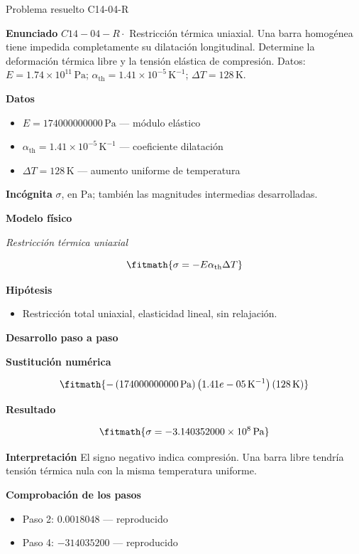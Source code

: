 \documentclass[10pt,openany]{book}
\begin{document}
\begin{studiumworked}{Problema resuelto C14-04-R}


\noindent\textbf{Enunciado}
\(C14-04-R \cdot\) Restricción térmica uniaxial. Una barra homogénea tiene impedida completamente su dilatación longitudinal. Determine la deformación térmica libre y la tensión elástica de compresión. Datos: \(E=1.74\times 10^{11}\, \mathrm{Pa}\); \(\alpha_{\mathrm{th}}=1.41\times 10^{-5}\, \mathrm{K}^{-1}\); \(\Delta T=128\, \mathrm{K}\).

\noindent\textbf{Datos}
\begin{itemize}
\item $E = 174000000000\,\mathrm{Pa}$ — módulo elástico
\item $\alpha_{\mathrm{th}} = 1.41\times 10^{-5}\,\mathrm{K}^{-1}$ — coeficiente dilatación
\item $\Delta T = 128\,\mathrm{K}$ — aumento uniforme de temperatura
\end{itemize}

\noindent\textbf{Incógnita}
$\sigma$, en $\mathrm{Pa}$; también las magnitudes intermedias desarrolladas.

\noindent\textbf{Modelo físico}

\noindent\textit{Restricción térmica uniaxial}

\[
\fitmath{\sigma=- E \alpha_{\mathrm{th}} \Delta T}
\]

\noindent\textbf{Hipótesis}
\begin{itemize}
\item Restricción total uniaxial, elasticidad lineal, sin relajación.
\end{itemize}

\noindent\textbf{Desarrollo paso a paso}



\noindent\textbf{Sustitución numérica}

\[
\fitmath{- \left(174000000000\,\mathrm{Pa}\right) \left(1.41e-05\,\mathrm{K}^{-1}\right) \left(128\,\mathrm{K}\right)}
\]

\noindent\textbf{Resultado}

\[
\fitmath{\sigma=-3.140352000\times10^{8}\,\mathrm{Pa}}
\]

\noindent\textbf{Interpretación}
El signo negativo indica compresión. Una barra libre tendría tensión térmica nula con la misma temperatura uniforme.

\noindent\textbf{Comprobación de los pasos}
\begin{itemize}
\item Paso 2: $0.0018048$ — reproducido
\item Paso 4: $-314035200$ — reproducido
\end{itemize}


\end{studiumworked}
\end{document}
